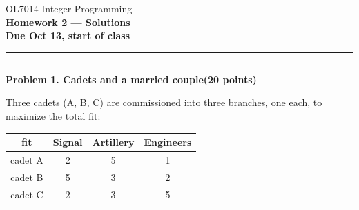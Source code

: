 \documentclass[10pt]{article}
\newcommand{\problem}[2]{%
  \par\bigskip
  {\color{ruleink}\rule{\textwidth}{1pt}}\par\nobreak\vspace{3pt}
  {\large\bfseries #2}\hfill{\normalsize\bfseries(#1 points)}\par\nobreak\vspace{4pt}}
\begin{document}
\begin{center}
  {\large OL7014 Integer Programming}\\[3pt]
  {\Large\bfseries Homework 2 --- Solutions}\\[4pt]
  {\small \textbf{Due Oct 13, start of class}}
\end{center}
\medskip\hrule\medskip

\problem{20}{Problem 1. Cadets and a married couple}

Three cadets (A, B, C) are commissioned into three branches, one each, to maximize the
total fit:
\begin{center}
\begin{tabular}{c|ccc}
 fit & Signal & Artillery & Engineers \\ \hline
 cadet A & 2 & 5 & 1 \\
 cadet B & 5 & 3 & 2 \\
 cadet C & 2 & 3 & 5 \\
\end{tabular}
\end{center}
\end{document}
